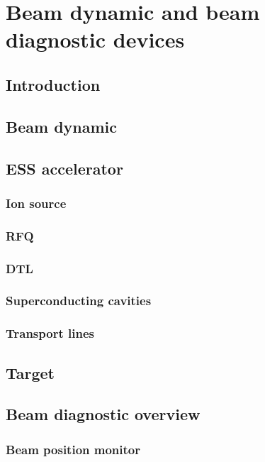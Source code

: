 \chapter{Beam dynamic and beam diagnostic devices}
\cleardoublepage

\minitoc
\section{Introduction}
\begin{refsection}
	\label{ch2:Introduction}

	\section{Beam dynamic}
	\section{ESS accelerator}
	

	\subsection{Ion source}
	\subsection{RFQ}
	\subsection{DTL}
	\subsection{Superconducting cavities}
	\subsection{Transport lines}

	\section{Target}

	\section{Beam diagnostic overview}
	\subsection{Beam position monitor}

\end{refsection}
